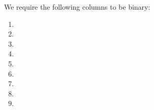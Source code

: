 We require the following columns to be binary:
\begin{multicols}{3}
	\begin{enumerate}
		\item \iomf{}
		\item \transactionTypeWithAuthorityLists{}
		\item \transactionTypeSansAuthorityLists{}
		\item \computation{}
		\item \macro{}
		\item \utils{}
		\item \rlpAuthUtilsColumnLimbBit{}
		\item[\vspace{\fill}]
		\item[\vspace{\fill}]
	\end{enumerate}
\end{multicols}
